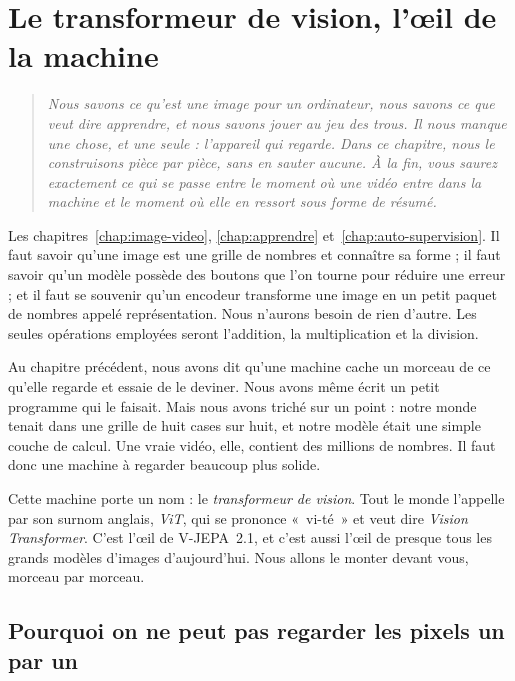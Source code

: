 \chapter{Le transformeur de vision, l'œil de la machine}
\label{chap:vit}

\begin{quote}\itshape
Nous savons ce qu'est une image pour un ordinateur, nous savons ce que veut
dire apprendre, et nous savons jouer au jeu des trous. Il nous manque une
chose, et une seule : l'appareil qui regarde. Dans ce chapitre, nous le
construisons pièce par pièce, sans en sauter aucune. À la fin, vous saurez
exactement ce qui se passe entre le moment où une vidéo entre dans la
machine et le moment où elle en ressort sous forme de résumé.
\end{quote}

\begin{prerequis}
Les chapitres~\ref{chap:image-video}, \ref{chap:apprendre}
et~\ref{chap:auto-supervision}. Il faut savoir qu'une image est une grille
de nombres et connaître sa forme ; il faut savoir qu'un modèle possède des
boutons que l'on tourne pour réduire une erreur ; et il faut se souvenir
qu'un encodeur transforme une image en un petit paquet de nombres appelé
représentation. Nous n'aurons besoin de rien d'autre. Les seules opérations
employées seront l'addition, la multiplication et la division.
\end{prerequis}

Au chapitre précédent, nous avons dit qu'une machine cache un morceau de ce
qu'elle regarde et essaie de le deviner. Nous avons même écrit un petit
programme qui le faisait. Mais nous avons triché sur un point : notre monde
tenait dans une grille de huit cases sur huit, et notre modèle était une
simple couche de calcul. Une vraie vidéo, elle, contient des millions de
nombres. Il faut donc une machine à regarder beaucoup plus solide.

Cette machine porte un nom : le \emph{transformeur de vision}. Tout le
monde l'appelle par son surnom anglais, \emph{ViT}, qui se prononce
«~vi-té~» et veut dire \emph{Vision Transformer}. C'est l'œil de V-JEPA~2.1,
et c'est aussi l'œil de presque tous les grands modèles d'images
d'aujourd'hui. Nous allons le monter devant vous, morceau par morceau.

\section{Pourquoi on ne peut pas regarder les pixels un par un}

